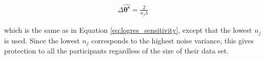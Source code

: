 \begin{eqnarray}
\label{eq:aggregated_logistic_sensitivity}
\Delta\boldsymbol{\hat{\theta^s}} = \frac{2}{n_j\lambda}
\end{eqnarray}


which is the same as in Equation \ref{eq:logres_sensitivity}, except that the lowest $n_j$ is used. Since the lowest $n_j$ corresponds to the highest noise variance, this gives protection to all the participants regardless of the size of their data set.

%
%
%
%
%

